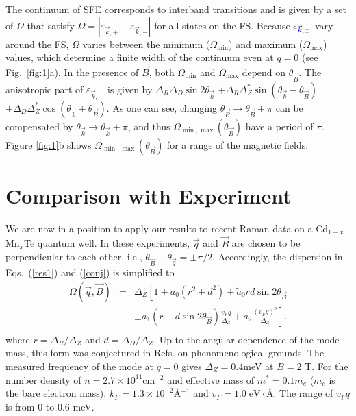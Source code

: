 \documentclass[prb,aps,twocolumn]{revtex4}
\def\blue{\color{blue}}
\newcommand{\bea}{\begin{eqnarray}}
\newcommand{\eea}{\end{eqnarray}}
\newcommand{\e}{\varepsilon}
\newcommand{\bk}{{\vec k}}
\newcommand{\bq}{{\vec q}}
\newcommand{\bB}{{\vec B}}
\newcommand{\nn}{\nonumber}
\begin{document}
The continuum of SFE corresponds to interband transitions and is
given by a set of $\Omega$ that satisfy
$\Omega=|\e_{\bk,+}-\e_{\bk,-}|$ for all states on the FS. Because
$\e_{{\blue \bk},\pm}$ vary around the FS, $\Omega$ varies between
the minimum ($\Omega_{\min}$) and maximum ($\Omega_{\max}$)
values, which determine a finite width of the continuum even at
$q=0$ (see Fig.~\ref{fig:1}a).   In the presence of $\vec B$, both
$\Omega_{{\min}} $ and $\Omega_{{\max}} $ depend on $\theta_\bB$.
The anisotropic part of $\e_{\bk,\pm}$ is given by
$\Delta_R\Delta_D\sin2\theta_\bk$
$+\Delta_R\Delta^*_Z\sin(\theta_\bk-\theta_\bB)$$+\Delta_D\Delta^*_Z\cos(\theta_\bk+\theta_\bB)$.
As one can see, changing $\theta_\bB\rightarrow\theta_\bB+\pi$ can
be compensated by $\theta_\bk\rightarrow\theta_\bk+\pi$, and thus
$\Omega_{\min,\max}(\theta_\bB)$ have a period of $\pi$. Figure
\ref{fig:1}b shows $\Omega_{\min,\max}(\theta_\bB)$ for a range of
the magnetic fields.

\section{Comparison with Experiment}
\label{sec:exp}
We are now in a position to apply our results to recent Raman data
on a Cd$_{1-x}$Mn$_x$Te quantum well.\cite{BBX1,BBX2,BBX3} In these
experiments, $\bq$ and $\bB$ are chosen to be perpendicular to
each other, i.e.,  $\theta_{\bB}-\theta_\bq=\pm\pi/2$.
Accordingly, the dispersion in Eqs.~(\ref{res1}) and (\ref{conj})
is simplified to \bea
\Omega(\bq,\bB)&=&\Delta_Z\left[1+a_0(r^2+d^2)+\tilde a_0 rd \sin
2\theta_\bB\right.\nn
\\&&\left.\pm a_1\left(r-d\sin2\theta_{\vec B}\right)\frac{v_Fq}{\Delta_Z}+a_2\frac{(v_Fq)^2}{\Delta_Z}
\right].
\nn\\
\label{fit} \eea where $r=\Delta_R/\Delta_Z$ and
$d=\Delta_D/\Delta_Z$. Up to the angular dependence of the mode
mass, this form was conjectured in Refs.  on
phenomenological grounds. The measured frequency of the mode at
$q=0$ gives $\Delta_Z=0.4$\;meV at $B=2$ T. For the number density
of $n=2.7\times10^{11}$cm$^{-2}$ and effective mass of
$m^*=0.1m_e$ ($m_e$ is the bare electron mass),
$k_F=1.3\times10^{-2}$\AA$^{-1}$ and $v_F=1.0\;\text{eV}\cdot$\AA.
The range of $v_Fq$ is from $0$ to  $0.6$ meV.
\end{document}
